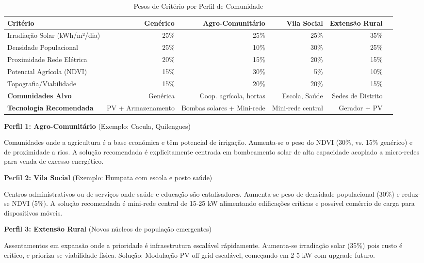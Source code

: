 \documentclass[12pt, a4paper]{article}
\begin{document}
\begin{table}[H]
\centering
\caption{Pesos de Critério por Perfil de Comunidade}
\label{tab:profiles_weights}
\footnotesize
\begin{tabular}{|l|r|r|r|r|r|}
\hline
\textbf{Critério} & \textbf{Genérico} & \textbf{Agro-Comunitário} & \textbf{Vila Social} & \textbf{Extensão Rural} \\
\hline
Irradiação Solar (kWh/m²/dia) & 25\% & 25\% & 25\% & 35\% \\
Densidade Populacional & 25\% & 10\% & 30\% & 25\% \\
Proximidade Rede Elétrica & 20\% & 15\% & 20\% & 15\% \\
Potencial Agrícola (NDVI) & 15\% & 30\% & 5\% & 10\% \\
Topografia/Viabilidade & 15\% & 20\% & 20\% & 15\% \\
\hline
\textbf{Comunidades Alvo} & Genérica & Coop. agrícola, hortas & Escola, Saúde & Sedes de Distrito \\
\hline
\textbf{Tecnologia Recomendada} & PV + Armazenamento & Bombas solares + Mini-rede & Mini-rede central & Gerador + PV \\
\hline
\end{tabular}
\end{table}

\textbf{Perfil 1: Agro-Comunitário} (Exemplo: Cacula, Quilengues)

Comunidades onde a agricultura é a base económica e têm potencial de irrigação. 
Aumenta-se o peso do NDVI (30\%, vs. 15\% genérico) e de proximidade a rios. 
A solução recomendada é explicitamente centrada em bombeamento solar de alta capacidade 
acoplado a micro-redes para venda de excesso energético.

\textbf{Perfil 2: Vila Social} (Exemplo: Humpata com escola e posto saúde)

Centros administrativos ou de serviços onde saúde e educação são catalisadores. 
Aumenta-se peso de densidade populacional (30\%) e reduz-se NDVI (5\%). 
A solução recomendada é mini-rede central de 15-25 kW alimentando edificações críticas 
e possível comércio de carga para dispositivos móveis.

\textbf{Perfil 3: Extensão Rural} (Novos núcleos de população emergentes)

Assentamentos em expansão onde a prioridade é infraestrutura escalável rápidamente. 
Aumenta-se irradiação solar (35\%) pois custo é crítico, e prioriza-se viabilidade 
física. Solução: Modulação PV off-grid escalável, começando em 2-5 kW com upgrade futuro.
\end{document}
